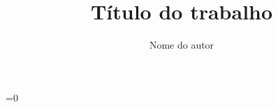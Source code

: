 \documentclass[
12pt,        %
openright,   %
twoside,     %
a4paper,     %
english,       %
brazil        %
%
%
]{ppgca}
\title{Título do trabalho}
\author{Nome do autor}
\begin{document}
=0
\newcommand{\sectionbreak}{\clearpage
\fancyhead[LE,RO]{}
\fancyhead[RE,LO]{}
\renewcommand{\headrulewidth}{0pt}
\renewcommand{\footrulewidth}{0pt}}
\fi


\imprimircapa

\imprimirfolhaderosto



%
%     
\end{document}
